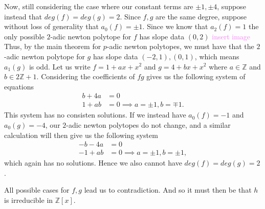 \documentclass[12pt,letterpaper,boxed]{hmcpset}
\newcommand{\wg}[1]{\textcolor{violet}{#1}}
\newcommand{\Z}{\mathbb Z}
\begin{document}
\begin{solution}
\begin{itemize}
Now, still considering the case where our constant terms are $\pm 1,
\pm 4$, suppose instead that $deg(f) = deg(g) = 2$. Since $f,g$ are
the same degree, suppose without loss of generality that $a_0(f) = \pm
1$. Since we know that $a_2(f) = 1$ the only possible $2$-adic newton
polytope for $f$ has slope data $(0,2)$
\wg{insert image}
Thus, by the main theorem for $p$-adic newton polytopes, we must have
that the $2$-adic newton polytope for $g$ has slope data $(-2,1),
(0,1)$, which means $a_1(g)$ is odd.
Let us write $f = 1 + ax + x^2$ and $g = 4 + bx + x^2$ where $a \in
\Z$ and $b \in 2\Z + 1$. Considering the coefficients of $fg$ gives us
the following system of equations 
\begin{align*}
	b + 4a &= 0 \\
	1 + ab &= 0 \implies a = \pm 1, b = \mp 1.
\end{align*}
This system has no consisten solutions.
If we instead have $a_0(f) = -1$ and $a_0(g) = -4$, our $2$-adic
newton polytopes do not change, and a similar calculation will then
give us the following system
\begin{align*}
	-b -4a &= 0 \\
	-1 + ab &= 0 \implies a = \pm 1, b = \pm 1,
\end{align*}
which again has no solutions. Hence we also cannot have $deg(f) =
deg(g) = 2$. 

All possible cases for $f,g$ lead us to contradiction. And so it must
then be that $h$ is irreducible in $\Z[x]$. 



\end{itemize}
\end{solution}

\newpage
\end{document}
